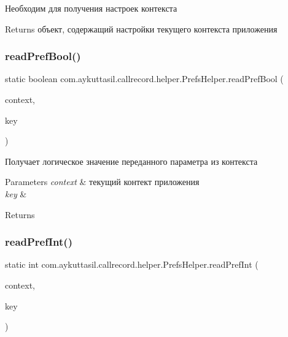 Необходим для получения настроек контекста \begin{DoxyReturn}{Returns}
объект, содержащий настройки текущего контекста приложения 
\end{DoxyReturn}
\mbox{\label{classcom_1_1aykuttasil_1_1callrecord_1_1helper_1_1_prefs_helper_a8c9acf31069d845c987e1f1dfe5b6e40}} 
\subsubsection{\texorpdfstring{read\+Pref\+Bool()}{readPrefBool()}}
{\footnotesize\ttfamily static boolean com.\+aykuttasil.\+callrecord.\+helper.\+Prefs\+Helper.\+read\+Pref\+Bool (\begin{DoxyParamCaption}\item[{Context}]{context,  }\item[{String}]{key }\end{DoxyParamCaption})\hspace{0.3cm}{\ttfamily [static]}}

Получает логическое значение переданного параметра из контекста 
\begin{DoxyParams}{Parameters}
{\em context} & текущий контект приложения \\
\hline
{\em key} & \\
\hline
\end{DoxyParams}
\begin{DoxyReturn}{Returns}

\end{DoxyReturn}
\mbox{\label{classcom_1_1aykuttasil_1_1callrecord_1_1helper_1_1_prefs_helper_af5d55ee9a54f2d21b1d46b48c58653a3}} 
\subsubsection{\texorpdfstring{read\+Pref\+Int()}{readPrefInt()}}
{\footnotesize\ttfamily static int com.\+aykuttasil.\+callrecord.\+helper.\+Prefs\+Helper.\+read\+Pref\+Int (\begin{DoxyParamCaption}\item[{Context}]{context,  }\item[{String}]{key }\end{DoxyParamCaption})\hspace{0.3cm}{\ttfamily [static]}}

